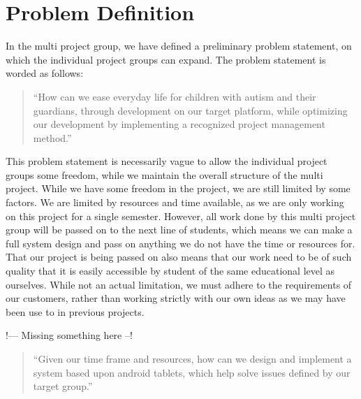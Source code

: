 \section{Problem Definition}
In the multi project group, we have defined a preliminary problem statement, on which the individual project groups can expand.
The problem statement is worded as follows: 
\begin{quotation}
 ``How can we ease everyday life for children with autism and their guardians, through development on our target platform,
 while optimizing our development by implementing a recognized project management method.''
\end{quotation}

This problem statement is necessarily vague to allow the individual project groups some freedom, while we maintain the overall structure of the multi project.
While we have some freedom in the project, we are still limited by some factors.
We are limited by resources and time available, as we are only working on this project for a single semester. However, all work done by this multi project group
will be passed on to the next line of students, which means we can make a full system design and pass on anything we do not have the time or resources for.
That our project is being passed on also means that our work need to be of such quality that it is easily accessible by student of the same educational level as ourselves.
While not an actual limitation, we must adhere to the requirements of our customers, rather than working strictly with our own ideas as we may have been use to in previous projects.

!--- Missing something here --!
\begin{quotation}
 ``Given our time frame and resources, how can we design and implement a system based upon android tablets, which help solve issues defined by our target group.''
\end{quotation}




  



